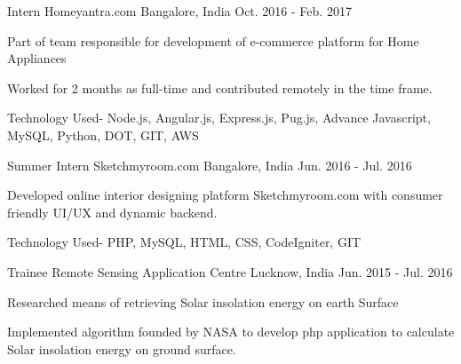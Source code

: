 \begin{cventries}
  \cventry
    {Intern}
    {Homeyantra.com}
    {Bangalore, India}
    {Oct. 2016 - Feb. 2017}
    {
      \begin{cvitems}
        \item {Part of team responsible for development of e-commerce platform for Home Appliances}
        \item {Worked for 2 months as full-time and contributed remotely in the time frame.}
        \item {Technology Used- Node.js, Angular.js, Express.js,  Pug.js, Advance Javascript, MySQL, Python, DOT, GIT, AWS}
      \end{cvitems}
    }
  \cventry
    {Summer Intern}
    {Sketchmyroom.com}
    {Bangalore, India}
    {Jun. 2016 - Jul. 2016}
    {
      \begin{cvitems}
        \item {Developed online interior designing platform Sketchmyroom.com with consumer friendly UI/UX and dynamic backend.}
        \item {Technology Used- PHP, MySQL, HTML, CSS, CodeIgniter, GIT}
      \end{cvitems}
    }
  \cventry
    {Trainee}
    {Remote Sensing Application Centre}
    {Lucknow, India}
    {Jun. 2015 - Jul. 2016}
    {
      \begin{cvitems}
        \item {Researched means of retrieving Solar insolation energy on earth Surface}
        \item {Implemented algorithm founded by NASA to develop php application to calculate Solar insolation energy on ground surface.}
      \end{cvitems}
    }
\end{cventries}
